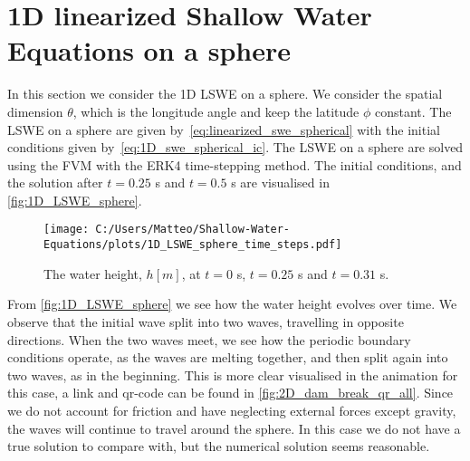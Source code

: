 \section{1D linearized Shallow Water Equations on a sphere}\label{sec:1D_sphere}
In this section we consider the 1D LSWE on a sphere.
We consider the spatial dimension $\theta$, which is the longitude angle and keep the latitude $\phi$ constant.
The LSWE on a sphere are given by~\eqref{eq:linearized_swe_spherical} with the initial conditions given by~\eqref{eq:1D_swe_spherical_ic}.
The LSWE on a sphere are solved using the FVM with the ERK4 time-stepping method.
The initial conditions, and the solution after $t = 0.25$ s and $t = 0.5$ s are visualised in \autoref{fig:1D_LSWE_sphere}.
\begin{figure}[H]
    \centering
    \texttt{[image: C:/Users/Matteo/Shallow-Water-Equations/plots/1D\_LSWE\_sphere\_time\_steps.pdf]}
    \caption{The water height, $h[m]$, at $t = 0$ s, $t = 0.25$ s and $t = 0.31$ s.}\label{fig:1D_LSWE_sphere}
\end{figure}
From \autoref{fig:1D_LSWE_sphere} we see how the water height evolves over time.
We observe that the initial wave split into two waves, travelling in opposite directions.
When the two waves meet, we see how the periodic boundary conditions operate, as the waves are melting together, and then split again into two waves, as in the beginning.
This is more clear visualised in the animation for this case, a link and qr-code can be found in \autoref{fig:2D_dam_break_qr_all}.
Since we do not account for friction and have neglecting external forces except gravity, the waves will continue to travel around the sphere.
In this case we do not have a true solution to compare with, but the numerical solution seems reasonable.

